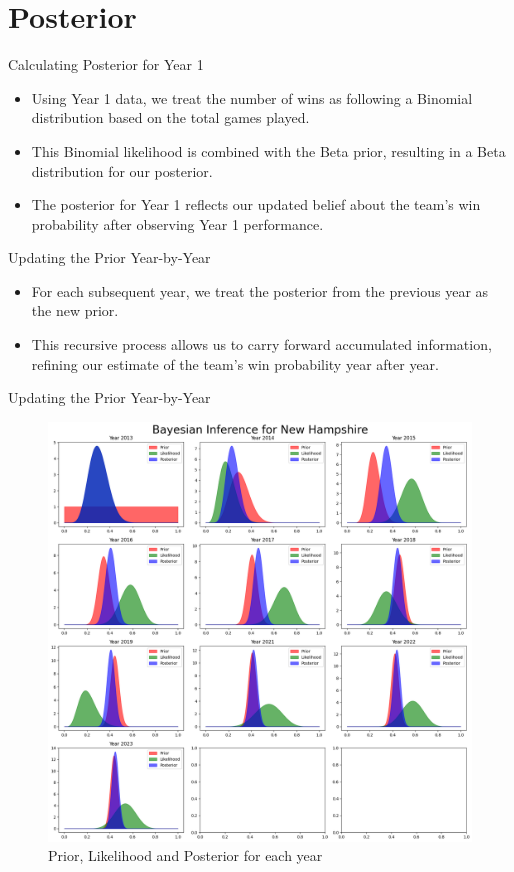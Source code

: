 \section{Posterior}

\begin{frame}{Calculating Posterior for Year 1}

  \begin{itemize}
    \item Using Year 1 data, we treat the number of wins as following a Binomial distribution based on the total games played.
    \item This Binomial likelihood is combined with the Beta prior, resulting in a Beta distribution for our posterior.
    \item The posterior for Year 1 reflects our updated belief about the team’s win probability after observing Year 1 performance.
  \end{itemize}
  
\end{frame}

\begin{frame}{Updating the Prior Year-by-Year}

  \begin{itemize}
    \item For each subsequent year, we treat the posterior from the previous year as the new prior.
    \item This recursive process allows us to carry forward accumulated information, refining our estimate of the team’s win probability year after year.
  \end{itemize}
  
\end{frame}

\begin{frame}{Updating the Prior Year-by-Year}
    
\begin{figure}
  \centering
  \includegraphics[width=.7\linewidth]{../Report/images/posterior-subplots.png}
  \caption{Prior, Likelihood and Posterior for each year}
\end{figure}

\end{frame}

